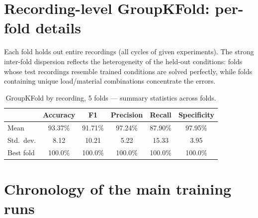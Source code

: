 \section{Recording-level GroupKFold: per-fold details}

Each fold holds out entire recordings (all cycles of given experiments). The strong inter-fold dispersion reflects the heterogeneity of the held-out conditions: folds whose test recordings resemble trained conditions are solved perfectly, while folds containing unique load/material combinations concentrate the errors.

\begin{table}[H]
\centering
\caption{GroupKFold by recording, 5 folds --- summary statistics across folds.}
\renewcommand{\arraystretch}{1.3}
\small
\begin{tabular}{|l|c|c|c|c|c|}
\hline
 & \textbf{Accuracy} & \textbf{F1} & \textbf{Precision} & \textbf{Recall} & \textbf{Specificity} \\
\hline
Mean & 93.37\% & 91.71\% & 97.24\% & 87.90\% & 97.95\% \\
\hline
Std.\ dev. & 8.12 & 10.21 & 5.22 & 15.33 & 3.95 \\
\hline
Best fold & 100.0\% & 100.0\% & 100.0\% & 100.0\% & 100.0\% \\
\hline
\end{tabular}
\end{table}

\section{Chronology of the main training runs}

